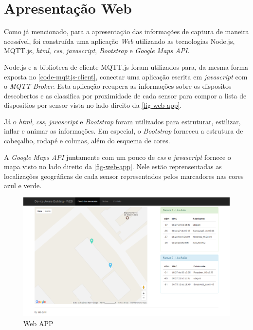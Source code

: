 \section{Apresentação Web}
\label{sec:app-web}

Como já mencionado, para a apresentação das informações de captura de maneira
acessível, foi construída uma aplicação \emph{Web} utilizando as tecnologias
Node.js, MQTT.js, \emph{html}, \emph{css}, \emph{javascript},
\emph{Bootstrap} e \emph{Google Maps API}.

Node.js e a biblioteca de cliente MQTT.js foram utilizados para,
da mesma forma exposta no \autoref{code-mqttjs-client}, conectar
uma aplicação escrita em \emph{javascript} com o \emph{MQTT Broker}. Esta
aplicação recupera as informações sobre os dispositos descobertos e as
classifica por proximidade de cada sensor para compor a lista de dispositios
por sensor vista no lado direito da \autoref{fig-web-app}.

Já o \emph{html}, \emph{css}, \emph{javascript} e \emph{Bootstrap} foram
utilizados para estruturar, estilizar, inflar e animar as informações. Em
especial, o \emph{Bootstrap} forneceu a estrutura de cabeçalho, rodapé e colunas,
além do esquema de cores.

A \emph{Google Maps API} juntamente com um pouco de \emph{css} e
\emph{javascript} fornece o mapa visto no lado direito da \autoref{fig-web-app}.
Nele estão reprensentadas as localizações geográficas de cada sensor
representados pelos marcadores nas cores azul e verde.

\begin{figure}[htb]
	\caption{\label{fig-web-app}Web APP}
	\begin{center}
		\includegraphics[width=1\textwidth]{053-web/web-app.png}
	\end{center}
\end{figure}
